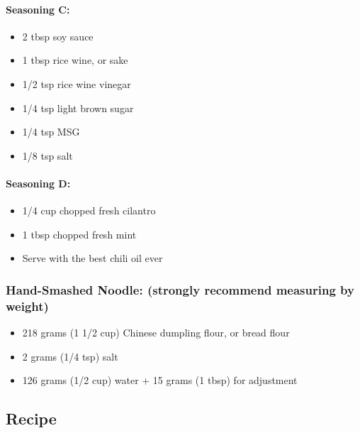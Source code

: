 \documentclass[
]{article}
\providecommand{\tightlist}{%
  \setlength{\itemsep}{0pt}\setlength{\parskip}{0pt}}
\begin{document}
\hypertarget{seasoning-c}{%
\paragraph{Seasoning C:}\label{seasoning-c}}

\begin{itemize}
\tightlist
\item
  2 tbsp soy sauce
\item
  1 tbsp rice wine, or sake
\item
  1/2 tsp rice wine vinegar
\item
  1/4 tsp light brown sugar
\item
  1/4 tsp MSG
\item
  1/8 tsp salt
\end{itemize}

\hypertarget{seasoning-d}{%
\paragraph{Seasoning D:}\label{seasoning-d}}

\begin{itemize}
\tightlist
\item
  1/4 cup chopped fresh cilantro
\item
  1 tbsp chopped fresh mint
\item
  Serve with the best chili oil ever
\end{itemize}

\hypertarget{hand-smashed-noodle-strongly-recommend-measuring-by-weight}{%
\subsubsection{Hand-Smashed Noodle: (strongly recommend measuring by weight)}\label{hand-smashed-noodle-strongly-recommend-measuring-by-weight}}

\begin{itemize}
\tightlist
\item
  218 grams (1 1/2 cup) Chinese dumpling flour, or bread flour
\item
  2 grams (1/4 tsp) salt
\item
  126 grams (1/2 cup) water + 15 grams (1 tbsp) for adjustment
\end{itemize}

\hypertarget{recipe-1}{%
\subsection{Recipe}\label{recipe-1}}
\end{document}
